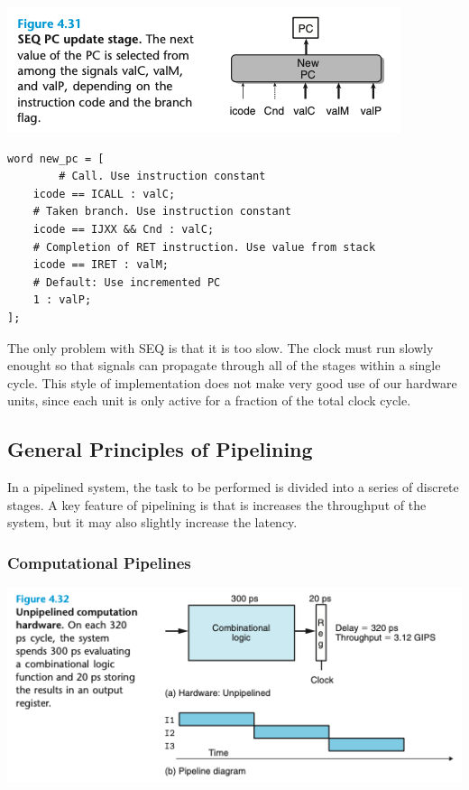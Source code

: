\documentclass[11pt]{article}
\begin{document}
\begin{enumerate}
\begin{center}
\includegraphics[width=.9\linewidth]{pics/figure4.31-seq-pc-update-stage.png}
\end{center}

\begin{verbatim}
word new_pc = [
        # Call. Use instruction constant
	icode == ICALL : valC;
	# Taken branch. Use instruction constant
	icode == IJXX && Cnd : valC;
	# Completion of RET instruction. Use value from stack
	icode == IRET : valM;
	# Default: Use incremented PC
	1 : valP;
];
\end{verbatim}


The only problem with SEQ is that it is too slow. The clock must run slowly enought so that signals can propagate through all of the stages within a single cycle. This style of implementation does not make very good use of our hardware units, since each unit is only active for a fraction of the total clock cycle.\\
\end{enumerate}

\subsection{General Principles of Pipelining}
\label{sec:org3757c56}
In a pipelined system, the task to be performed is divided into a series of discrete stages. A key feature of pipelining is that is increases the throughput of the system, but it may also slightly increase the latency.\\

\subsubsection{Computational Pipelines}
\label{sec:org792c8d4}

\begin{center}
\includegraphics[width=.9\linewidth]{pics/figure4.32-unpipelined-computation-hardware.png}
\end{center}
\end{document}
